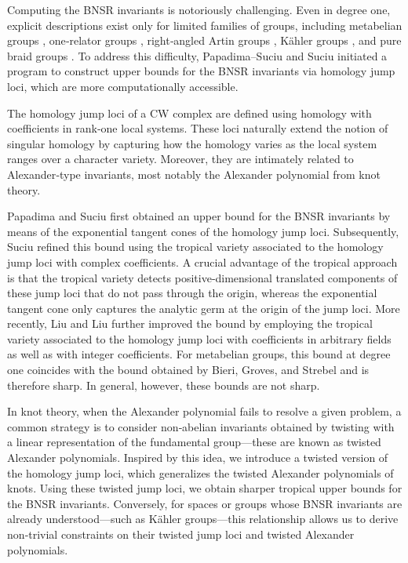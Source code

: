 \documentclass[11pt]{amsart}
\theoremstyle{definition}
\begin{document}
Computing the BNSR invariants is notoriously challenging. Even in degree one, explicit descriptions
exist only for limited families of groups, including metabelian groups \cite{BS80,BS81,BG},
one‑relator groups \cite{Br}, right‑angled Artin groups \cite{MMV}, K\"ahler groups \cite{De10},
and pure braid groups \cite{KMM}. To address this difficulty, Papadima--Suciu
\cite{PS-plms} and Suciu \cite{Su-mathann} initiated a program to construct
upper bounds for the BNSR invariants via homology jump loci, which are more
computationally accessible.

The homology jump loci of a CW complex are defined using homology with coefficients in
rank‑one local systems. These loci naturally extend the notion of singular homology by
capturing how the homology varies as the local system ranges over a character variety.
Moreover, they are intimately related to Alexander‑type invariants, most notably the
Alexander polynomial from knot theory.

Papadima and Suciu \cite{PS-plms} first obtained an upper bound for the
BNSR invariants by means of the exponential tangent cones of the homology jump loci.
Subsequently, Suciu \cite{Su-mathann} refined this bound using the
tropical variety associated to the homology jump loci with complex coefficients. A crucial
advantage of the tropical approach is that the tropical variety detects positive‑dimensional
translated components of these jump loci that do not pass through the origin, whereas the
exponential tangent cone only captures the analytic germ at the origin of the jump loci.
More recently, Liu and Liu \cite{LL} further improved the bound by
employing the tropical variety associated to the homology jump loci with coefficients in
arbitrary fields as well as with integer coefficients. For metabelian groups, this bound
at degree one coincides with the bound obtained by Bieri, Groves, and Strebel \cite{BS80,BS81,BG}
and is therefore sharp. In general, however, these bounds are not sharp.

In knot theory, when the Alexander polynomial fails to resolve a given problem, a common
strategy is to consider non‑abelian invariants obtained by twisting with a linear representation
of the fundamental group---these are known as twisted Alexander polynomials. Inspired by
this idea, we introduce a twisted version of the homology jump loci, which generalizes the
twisted Alexander polynomials of knots. Using these twisted jump loci, we obtain sharper
tropical upper bounds for the BNSR invariants. Conversely, for spaces or groups whose
BNSR invariants are already understood---such as K\"ahler groups---this relationship
allows us to derive non‑trivial constraints on their twisted jump loci and twisted Alexander
polynomials.
\end{document}
